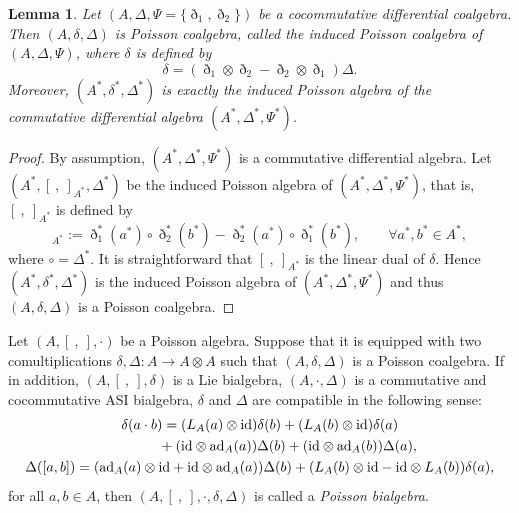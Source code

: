 \documentclass[pdftex]{sigma}
\numberwithin{equation}{section}
\newtheorem{Lemma}[Theorem]{Lemma}
\newcommand{\ad}{\mathrm{ad}}
\newcommand{\id}{\mathrm{id}}
\begin{document}
\begin{Lemma} Let $(A, \Delta, \Psi \!=\! \{\eth_1, \eth_2\})$ be a cocommutative differential coalgebra.
 Then $(A, \delta, \Delta)$ is Poisson coalgebra, called the \textit{induced Poisson coalgebra} of $(A, \Delta, \Psi)$, where $\delta$ is defined by
 \begin{equation}
 \delta = (\eth_1 \otimes \eth_2 - \eth_2 \otimes \eth_1)
 \Delta. \label{eq:coP}
 \end{equation}
 Moreover, $(A^*, \delta^*, \Delta^*)$ is exactly the induced Poisson algebra of the commutative differential algebra $(A^*, \Delta^*, \Psi^*)$.
\end{Lemma}
\begin{proof}
 By assumption, $(A^*, \Delta^*, \Psi^*)$ is a commutative differential algebra.
 Let $(A^*, [\ ,\ ]_{A^*}, \Delta^*)$ be the induced Poisson algebra of $(A^*, \Delta^*, \Psi^*)$, that is, $[\ ,\ ]_{A^*}$ is defined by
 \begin{equation*}
 [a^*, b^*]_{A^*} := \eth_1^*(a^*) \circ \eth_2^*(b^*) - \eth_2^*(a^*) \circ \eth_1^*(b^*), \qquad \forall a^*, b^*\in A^*,
 \end{equation*}
 where $\circ = \Delta^*$.
 It is straightforward that $[\ ,\ ]_{A^*}$ is the linear dual of $\delta$.
 Hence $(A^*, \delta^*, \Delta^*)$ is the induced Poisson algebra of $(A^*, \Delta^*, \Psi^*)$ and thus $(A, \delta, \Delta)$ is a Poisson coalgebra.
\end{proof}

\begin{Definition}
 Let $(A, [\ ,\ ], \cdot)$ be a Poisson algebra.
 Suppose that it is equipped with two comultiplications $\delta, \Delta\colon A \to A \otimes A$ such that $(A, \delta, \Delta)$ is a Poisson coalgebra.
 If in addition, $(A, [\ ,\ ], \delta)$ is a Lie bialgebra,
 $(A, \cdot, \Delta)$ is a commutative and cocommutative ASI bialgebra,
 $\delta$ and $\Delta$ are compatible in the following sense:
 \begin{gather}
 	\delta(a \cdot b) = (L_A(a) \otimes \id)\delta(b) + (L_A(b) \otimes \id)\delta(a) \nonumber\\
 \hphantom{\delta(a \cdot b) =}{} + (\id \otimes \ad_A(a))\Delta(b) + (\id \otimes \ad_A(b))\Delta(a), \label{eq:poibi1} \\
 \Delta([a, b]) = (\ad_A(a) \otimes \id + \id \otimes \ad_A(a))\Delta(b) + (L_A(b) \otimes \id - \id \otimes L_A(b))\delta(a), \label{eq:poibi2}
 \end{gather}
 for all $a, b \in A$, then $(A, [\ ,\ ], \cdot, \delta, \Delta)$ is called a \textit{Poisson bialgebra}.
\end{Definition}
\end{document}
